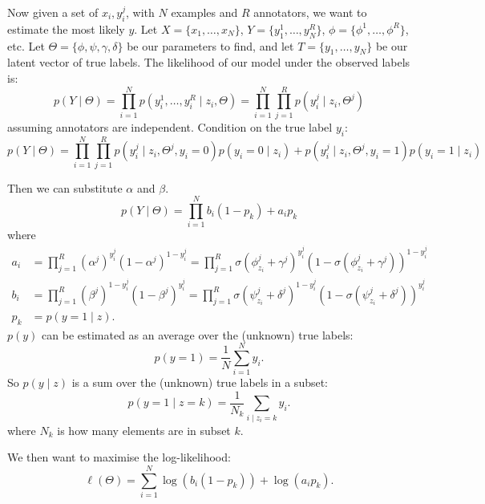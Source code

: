 \documentclass[a4paper]{article}
\begin{document}
    Now given a set of $x_i, y_i^j$, with $N$ examples and $R$ annotators, we want to estimate the most likely $y$. Let $X = \{x_1, \dots, x_N\}$, $Y = \{y_1^1, \dots, y_N^R\}$, $\phi = \{\phi^1, \dots, \phi^R\}$, etc. Let $\Theta = \{\phi, \psi, \gamma, \delta\}$ be our parameters to find, and let $T = \{y_1, \dots, y_N\}$ be our latent vector of true labels. The likelihood of our model under the observed labels is:
    \begin{equation}
        p(Y \mid \Theta) = \prod_{i = 1}^N p(y_i^1, \dots, y_i^R \mid z_i, \Theta) = \prod_{i = 1}^N \prod_{j = 1}^R p(y_i^j \mid z_i, \Theta^j)
    \end{equation}
    assuming annotators are independent. Condition on the true label $y_i$:
    \begin{equation}
        p(Y \mid \Theta) = \prod_{i = 1}^N \prod_{j = 1}^R p(y_i^j \mid z_i, \Theta^j, y_i = 0) p(y_i = 0 \mid z_i) + p(y_i^j \mid z_i, \Theta^j, y_i = 1) p(y_i = 1 \mid z_i)
    \end{equation}

    Then we can substitute $\alpha$ and $\beta$.
    \begin{equation}
        p(Y \mid \Theta) = \prod_{i = 1}^N b_i (1 - p_k) + a_i p_k
    \end{equation}
    where
    \begin{align}
        a_i &= \prod_{j = 1}^R (\alpha^j)^{y_i^j} (1 - \alpha^j)^{1 - y_i^j} = \prod_{j = 1}^R \sigma(\phi_{z_i}^j + \gamma^j)^{y_i^j} (1 - \sigma(\phi_{z_i}^j + \gamma^j))^{1 - y_i^j}\\
        b_i &= \prod_{j = 1}^R (\beta^j)^{1 - y_i^j} (1 - \beta^j)^{y_i^j} = \prod_{j = 1}^R \sigma(\psi_{z_i}^j + \delta^j)^{1 - y_i^j} (1 - \sigma(\psi_{z_i}^j + \delta^j))^{y_i^j}\\
        p_k &= p(y = 1 \mid z).
    \end{align}
    $p(y)$ can be estimated as an average over the (unknown) true labels:
    \begin{equation}
        p(y = 1) = \frac{1}{N} \sum_{i = 1}^{N} y_i.
    \end{equation}
    So $p(y \mid z)$ is a sum over the (unknown) true labels in a subset:
    \begin{equation}
        p(y = 1 \mid z = k) = \frac{1}{N_k} \sum_{i \mid z_i = k} y_i.
    \end{equation}
    where $N_k$ is how many elements are in subset $k$.

    We then want to maximise the log-likelihood:
    \begin{equation}
        \ell(\Theta) = \sum_{i = 1}^N \log \left(b_i (1 - p_k)\right) + \log \left(a_i p_k\right).
    \end{equation}
\end{document}
